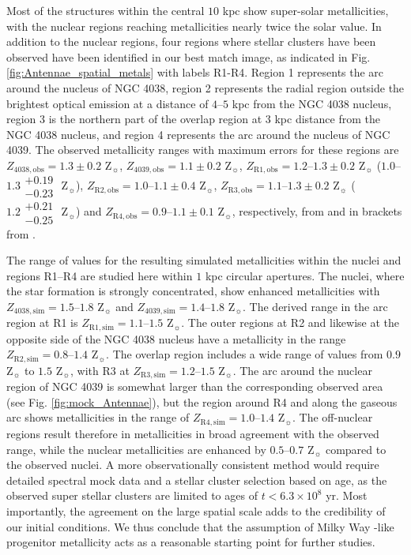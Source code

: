 \documentclass[a4paper,fleqn,usenatbib]{mnras}
\begin{document}
Most of the structures within the central $10$ kpc show super-solar metallicities, with the nuclear
regions reaching metallicities nearly twice the solar value. 
In addition to the nuclear regions, four regions where stellar clusters have been observed 
have been identified in our best match image, as indicated in Fig. \ref{fig:Antennae_spatial_metals} with 
labels R1-R4. 
Region 1 represents the arc around the nucleus of NGC 4038, region 2 represents the radial region outside the brightest 
optical emission at a distance of $4$--$5$ kpc from the NGC 4038 nucleus, region 3 is the northern part of the
overlap region at $3$ kpc distance from the NGC 4038 nucleus, and region 4 represents the arc around the nucleus of NGC 4039. The observed metallicity 
ranges with maximum errors for these regions are 
$Z_\mathrm{4038, obs}=1.3\pm0.2$ Z$_{\sun}$, $Z_\mathrm{4039, obs}=1.1\pm0.2$ Z$_{\sun}$, $Z_\mathrm{R1, obs}=1.2$--$1.3\pm0.2$ Z$_{\sun}$ 
($1.0$--$1.3 \substack{+0.19 \\ -0.23}$ Z$_{\sun}$),
$Z_\mathrm{R2, obs}=1.0$--$1.1\pm0.4$ Z$_{\sun}$, $Z_\mathrm{R3, obs}=1.1$--$1.3\pm0.2$ Z$_{\sun}$ ($1.2 \substack{+0.21 \\ -0.25}$ Z$_{\sun}$)
 and $Z_\mathrm{R4, obs}=0.9$--$1.1\pm0.1$ Z$_{\sun}$, respectively,
from \citet{2009ApJ...701..607B} and in brackets from \citet{2015ApJ...812..160L}. 

The range of values for the resulting simulated metallicities within the nuclei and regions R1--R4 are studied here within $1$ kpc circular apertures.
The nuclei, where the star formation is strongly concentrated, show enhanced
metallicities with $Z_\mathrm{4038, sim}=1.5$--$1.8$ Z$_{\sun}$ and $Z_\mathrm{4039, sim}=1.4$--$1.8$ Z$_{\sun}$.
The derived range in the arc region at R1 is $Z_\mathrm{R1, sim}=1.1$--$1.5$ Z$_{\sun}$. The outer regions at
R2 and likewise at the opposite side of the NGC 4038 nucleus have a metallicity in the range $Z_\mathrm{R2, sim}=0.8$--$1.4$ Z$_{\sun}$. The overlap region
includes a wide range of values from $0.9$ Z$_{\sun}$ to $1.5$ Z$_{\sun}$, with R3 at $Z_\mathrm{R3, sim}=1.2$--$1.5$ Z$_{\sun}$. 
The arc around the nuclear region of NGC 4039
is somewhat larger than the corresponding observed area (see Fig. \ref{fig:mock_Antennae}), but the region around R4 and along the gaseous arc shows metallicities 
in the range of $Z_\mathrm{R4, sim}=1.0$--$1.4$ Z$_{\sun}$.
The off-nuclear regions result therefore in metallicities in broad agreement with the observed range,
while the nuclear metallicities are enhanced by $0.5$--$0.7$ Z$_{\sun}$ compared to the observed nuclei.
A more observationally consistent method would require detailed spectral mock data and a stellar cluster selection based on age, 
as the observed super stellar clusters are limited to ages of $t <6.3\times10^8$ yr.
Most importantly, the agreement on the large spatial scale adds to the credibility of our initial conditions.
We thus conclude that the assumption of Milky Way -like progenitor metallicity acts as a reasonable starting point for further studies.
\end{document}
